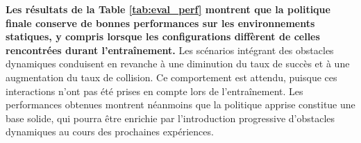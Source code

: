 \vspace{10pt}

\noindent \textbf{Les résultats de la Table \ref{tab:eval_perf} montrent que la politique finale conserve de bonnes performances sur les environnements statiques, y compris lorsque les configurations diffèrent de celles rencontrées durant l'entraînement.} Les scénarios intégrant des obstacles dynamiques conduisent en revanche à une diminution du taux de succès et à une augmentation du taux de collision. Ce comportement est attendu, puisque ces interactions n'ont pas été prises en compte lors de l'entraînement. Les performances obtenues montrent néanmoins que la politique apprise constitue une base solide, qui pourra être enrichie par l'introduction progressive d'obstacles dynamiques au cours des prochaines expériences.